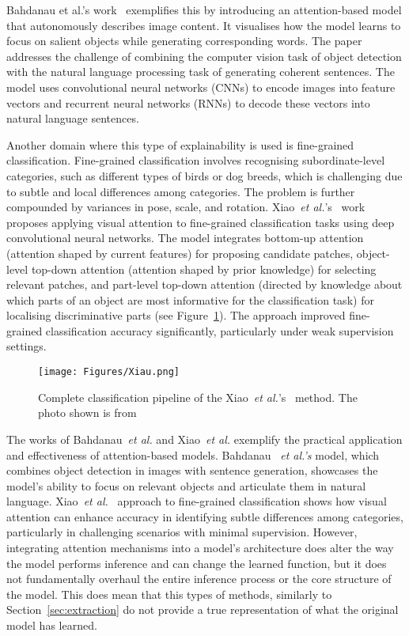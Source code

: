 Bahdanau et al.'s work~\cite{BahdanauCB14} exemplifies this by introducing an attention-based model that autonomously describes image content. It visualises how the model learns to focus on salient objects while generating corresponding words. The paper addresses the challenge of combining the computer vision task of object detection with the natural language processing task of generating coherent sentences. The model uses convolutional neural networks (CNNs) to encode images into feature vectors and recurrent neural networks (RNNs) to decode these vectors into natural language sentences.

Another domain where this type of explainability is used is fine-grained classification. Fine-grained classification involves recognising subordinate-level categories, such as different types of birds or dog breeds, which is challenging due to subtle and local differences among categories. The problem is further compounded by variances in pose, scale, and rotation. Xiao~\textit{et al.}'s~\cite{XiaoXYZPZ15} work proposes applying visual attention to fine-grained classification tasks using deep convolutional neural networks. The model integrates bottom-up attention (\ie attention shaped by current features) for proposing candidate patches, object-level top-down attention (\ie attention shaped by prior knowledge) for selecting relevant patches, and part-level top-down attention (\ie directed by knowledge about which parts of an object are most informative for the classification task) for localising discriminative parts (see Figure~\ref{Fig:loss-based-grained}). The approach improved fine-grained classification accuracy significantly, particularly under weak supervision settings.

\begin{figure}[ht!]
	\begin{center}
		\texttt{[image: Figures/Xiau.png]}
	\end{center}
	\caption{Complete classification pipeline of the Xiao~\textit{et al.}'s~\cite{XiaoXYZPZ15} method. The photo shown is from~\cite{XiaoXYZPZ15}}
	\label{Fig:loss-based-grained}
\end{figure} 

The works of Bahdanau~\textit{et al.}\cite{BahdanauCB14} and Xiao~\textit{et al.}\cite{XiaoXYZPZ15} exemplify the practical application and effectiveness of attention-based models. Bahdanau ~\textit{et al.'s }\cite{BahdanauCB14} model, which combines object detection in images with sentence generation, showcases the model's ability to focus on relevant objects and articulate them in natural language. Xiao~\textit{et al.}~\cite{XiaoXYZPZ15} approach to fine-grained classification shows how visual attention can enhance accuracy in identifying subtle differences among categories, particularly in challenging scenarios with minimal supervision. However, integrating attention mechanisms into a model's architecture does alter the way the model performs inference and can change the learned function, but it does not fundamentally overhaul the entire inference process or the core structure of the model. This does mean that this types of methods, similarly to Section~\ref{sec:extraction} do not provide a true representation of what the original model has learned. 


